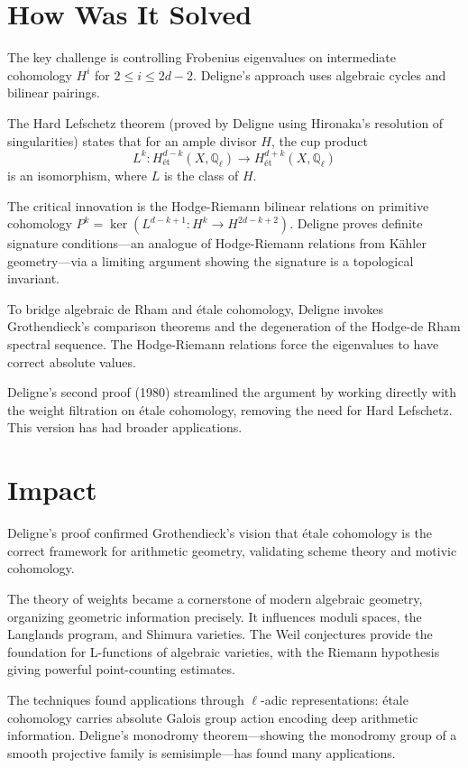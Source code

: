 \section*{How Was It Solved}

The key challenge is controlling Frobenius eigenvalues on intermediate
cohomology $H^i$ for $2 \leq i \leq 2d - 2$. Deligne's approach uses
algebraic cycles and bilinear pairings.

The Hard Lefschetz theorem (proved by Deligne using Hironaka's resolution
of singularities) states that for an ample divisor $H$, the cup product
\[
L^k: H^{d-k}_{\text{ét}}(X, \mathbb{Q}_\ell) \longrightarrow H^{d+k}_{\text{ét}}(X, \mathbb{Q}_\ell)
\]
is an isomorphism, where $L$ is the class of $H$.

The critical innovation is the Hodge-Riemann bilinear relations on
primitive cohomology
$P^k = \ker(L^{d-k+1}: H^k \to H^{2d-k+2})$. Deligne proves definite
signature conditions---an analogue of Hodge-Riemann relations from
K\"{a}hler geometry---via a limiting argument showing the signature is a
topological invariant.

To bridge algebraic de Rham and \'etale cohomology, Deligne invokes
Grothendieck's comparison theorems and the degeneration of the
Hodge-de Rham spectral sequence. The Hodge-Riemann relations force the
eigenvalues to have correct absolute values.

Deligne's second proof (1980) streamlined the argument by working
directly with the weight filtration on \'etale cohomology, removing the
need for Hard Lefschetz. This version has had broader applications.

\section*{Impact}

Deligne's proof confirmed Grothendieck's vision that \'etale cohomology
is the correct framework for arithmetic geometry, validating scheme
theory and motivic cohomology.

The theory of weights became a cornerstone of modern algebraic geometry,
organizing geometric information precisely. It influences moduli spaces,
the Langlands program, and Shimura varieties. The Weil conjectures provide
the foundation for L-functions of algebraic varieties, with the Riemann
hypothesis giving powerful point-counting estimates.

The techniques found applications through $\ell$-adic representations:
\'etale cohomology carries absolute Galois group action encoding deep
arithmetic information. Deligne's monodromy theorem---showing the
monodromy group of a smooth projective family is semisimple---has found
many applications.

